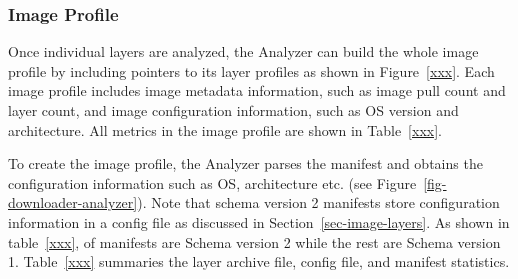 %



\subsubsection{Image Profile}

Once individual layers are analyzed, the Analyzer can build the whole image
profile by including pointers to its layer profiles as shown in
Figure~\ref{xxx}. Each image profile includes image metadata information,
such as image pull count and layer count, and image configuration
information, such as OS version and architecture. All metrics
in the image profile are shown in Table~\ref{xxx}.

To create the image profile, the Analyzer parses the manifest
and obtains the configuration information such as OS, architecture
etc. (see Figure~\ref{fig-downloader-analyzer}).
%
Note that schema version 2 manifests store configuration information in a
config file as discussed in Section~\ref{sec-image-layers}.
%
As shown in table~\ref{xxx}, \gap of manifests are Schema version 2 while the
rest are Schema version 1. 
%
%
%
Table~\ref{xxx} summaries the layer archive file, config file, and manifest
statistics.



